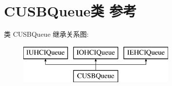 \hypertarget{class_c_u_s_b_queue}{}\section{C\+U\+S\+B\+Queue类 参考}
\label{class_c_u_s_b_queue}
类 C\+U\+S\+B\+Queue 继承关系图\+:\begin{figure}[H]
\begin{center}
\leavevmode
\includegraphics[height=2.000000cm]{class_c_u_s_b_queue}
\end{center}
\end{figure}
